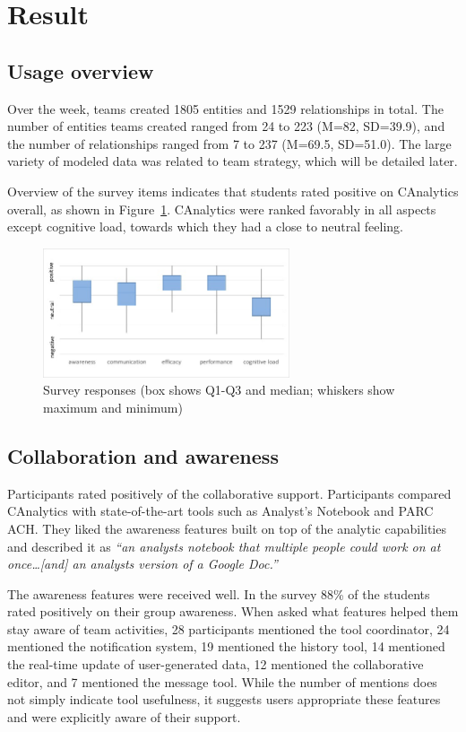 \section{Result}\label{result}

\subsection{Usage overview}\label{usage-overview}

Over the week, teams created 1805 entities and 1529 relationships in
total. The number of entities teams created ranged from 24 to 223 (M=82,
SD=39.9), and the number of relationships ranged from 7 to 237 (M=69.5,
SD=51.0). The large variety of modeled data was related to team
strategy, which will be detailed later.

Overview of the survey items indicates that students rated positive on
CAnalytics overall, as shown in Figure~\ref{fig:survey}. CAnalytics were ranked
favorably in all aspects except cognitive load, towards which they had a close
to neutral feeling.

\begin{figure}
\centering
\includegraphics[height=1.5in]{./img/survey_boxchart.jpg}
\caption{Survey responses (box shows Q1-Q3 and median; whiskers show
maximum and minimum)}\label{fig:survey}
\end{figure}

\subsection{Collaboration and
awareness}\label{collaboration-and-awareness}

Participants rated positively of the collaborative support. Participants
compared CAnalytics with state-of-the-art tools such as Analyst's
Notebook and PARC ACH. They liked the awareness features built on top of
the analytic capabilities and described it as \emph{``an analysts
notebook that multiple people could work on at once\ldots{}{[}and{]} an
analysts version of a Google Doc.''}

The awareness features were received well. In the survey 88\% of the
students rated positively on their group awareness. When asked what
features helped them stay aware of team activities, 28 participants
mentioned the tool coordinator, 24 mentioned the notification system, 19
mentioned the history tool, 14 mentioned the real-time update of
user-generated data, 12 mentioned the collaborative editor, and 7
mentioned the message tool. While the number of mentions does not simply
indicate tool usefulness, it suggests users appropriate these features
and were explicitly aware of their support.


